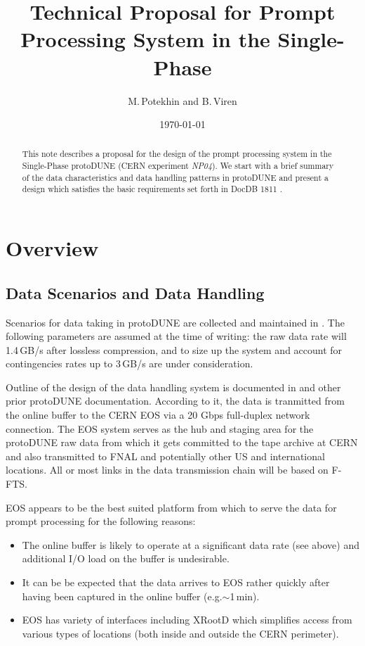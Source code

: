 \documentclass[pdftex,12pt,letter]{article}
\title{Technical Proposal for Prompt Processing System in the Single-Phase \pd}
\date{\today}
\author{M.\,Potekhin and B.\,Viren}
\newcommand{\pd}{protoDUNE\xspace}
\newcommand{\xrd}{XRootD\xspace}
\newcommand{\expname}{\textit{NP04}\xspace}
\begin{document}
\maketitle

\begin{abstract}
\noindent  This note describes a proposal for the design of
the prompt processing system in the Single-Phase \pd
(CERN experiment \expname). We start with a brief summary of the data characteristics and data handling patterns
in \pd \cite{docdb1086,docdb1212} and present a design which satisfies the basic requirements set
forth in  DocDB 1811 \cite{docdb1811}.
\end{abstract}

\section{Overview}
\subsection{Data Scenarios and Data Handling}
\label{sec:rawdata}
Scenarios for data taking in \pd are collected and maintained in \cite{docdb1086}. The following parameters
are assumed at the time of writing: the raw data rate will 1.4\,GB/s after lossless compression, and to size up
the system and account for contingencies rates up to 3\,GB/s are under consideration.

Outline of the design of the data handling system is documented in  \cite{docdb1212} and other prior \pd documentation.
According to it, the data is tranmitted from the online buffer to the CERN EOS via a 20 Gbps full-duplex network connection.
The EOS system serves as the hub and staging area for the \pd raw data from which
it gets committed to the tape archive at CERN and also transmitted to FNAL and potentially
other US and international locations. All or most links in the data transmission chain will be based on F-FTS.

EOS appears to be the best suited platform from which to
serve the data for prompt processing for the following reasons:
\begin{itemize}

\item The online buffer is likely to operate at a significant data rate (see above) and additional I/O load on the buffer is undesirable.

\item It can be be expected that the data arrives to EOS rather quickly after having been captured in the online buffer (e.g.$\sim$1\,min).

\item EOS has variety of interfaces including \xrd which simplifies access from various types of locations (both inside and outside the CERN perimeter).

\end{itemize}
\end{document}
